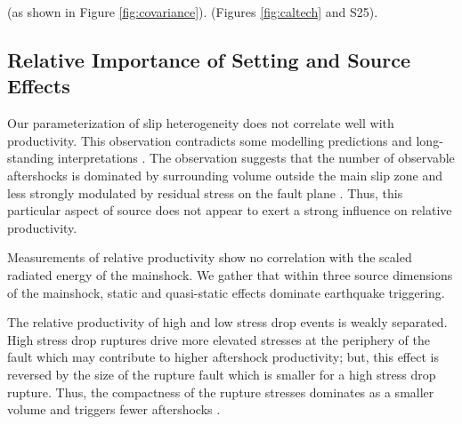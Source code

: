 \documentclass[draft, jgrga]{agujournal2018}
\begin{document}
 (as shown in Figure \ref{fig:covariance}).  (Figures \ref{fig:caltech} and S25). 

\subsection{Relative Importance of Setting and Source Effects}

Our parameterization of slip heterogeneity does not correlate well with productivity. This observation contradicts some modelling predictions \citep{Helmstetter2006RelationModel, Marsan2006} and long-standing interpretations \citep{Mogi1967}. The observation suggests that the number of observable aftershocks is dominated by surrounding volume outside the main slip zone and less strongly modulated by residual stress on the fault plane \citep[as would be consistent with][]{Wetzler2018SystematicEarthquakes}. Thus, this particular aspect of source does not appear to exert a strong influence on relative productivity.
    
Measurements of relative productivity show no correlation with the scaled radiated energy of the mainshock. We gather that within three source dimensions of the mainshock, static and quasi-static effects dominate earthquake triggering. 

The relative productivity of high and low stress drop events is weakly separated. High stress drop ruptures drive more elevated stresses at the periphery of the fault which may contribute to higher aftershock productivity; but, this effect is reversed by the size of the rupture fault which is smaller for a high stress drop rupture. Thus, the compactness of the rupture stresses dominates as a smaller volume and triggers fewer aftershocks \citep{Wetzler2016}.
\end{document}
